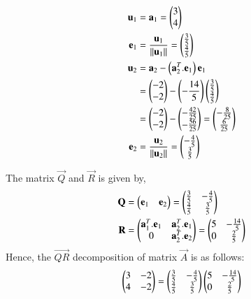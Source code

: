 \documentclass[journal,12pt,twocolumn]{IEEEtran}
\begin{document}
\begin{align}
\mathbf{u}_1 &= \mathbf{a}_1 = \begin{pmatrix}3 \\ 4\end{pmatrix} \\
\mathbf{e}_1 &= \frac{\mathbf{u}_1}{\left\lVert\mathbf{u}_1\right\rVert} = \begin{pmatrix}\frac{3}{5} \\ \frac{4}{5}\end{pmatrix}\\
\mathbf{u}_2 &= \mathbf{a}_2 - \left(\mathbf{a}_2^T.\mathbf{e}_1\right)\mathbf{e}_1\\ 
&= \begin{pmatrix}-2 \\ -2\end{pmatrix} - \left(-\frac{14}{5}\right)\begin{pmatrix}\frac{3}{5} \\ \frac{4}{5}\end{pmatrix}\\
&= \begin{pmatrix}-2 \\ -2\end{pmatrix} - \begin{pmatrix}-\frac{42}{25} \\ -\frac{56}{25}\end{pmatrix} = \begin{pmatrix}-\frac{8}{25} \\ \frac{6}{25}\end{pmatrix}\\
\mathbf{e}_2 &= \frac{\mathbf{u}_2}{\left\lVert\mathbf{u}_2\right\rVert}= \begin{pmatrix}-\frac{4}{5} \\ \frac{3}{5}\end{pmatrix}
\end{align}

The matrix $\vec{Q}$ and $\vec{R}$ is given by,
\begin{align}
\mathbf{Q}&=\begin{pmatrix}\mathbf{e}_1 & \mathbf{e}_2\end{pmatrix} = \begin{pmatrix}\frac{3}{5} & -\frac{4}{5} \\ \frac{4}{5} & \frac{3}{5}\end{pmatrix}\\
\mathbf{R} &= \begin{pmatrix}\mathbf{a}_1^T.\mathbf{e}_1 & \mathbf{a}_2^T.\mathbf{e}_1 \\
                  0                  & \mathbf{a}_2^T.\mathbf{e}_2\end{pmatrix}=\begin{pmatrix}5 & -\frac{14}{5} \\ 0 & \frac{2}{5}\end{pmatrix}
\end{align}
Hence, the $\vec{QR}$ decomposition of matrix $\vec{A}$ is as follows:
\begin{align}
	\begin{pmatrix}3& -2 \\ 4 & -2\end{pmatrix} = \begin{pmatrix}\frac{3}{5} & -\frac{4}{5} \\ \frac{4}{5} & \frac{3}{5}\end{pmatrix}\begin{pmatrix}5 & -\frac{14}{5} \\ 0 & \frac{2}{5}\end{pmatrix}
\end{align}
\end{document}
